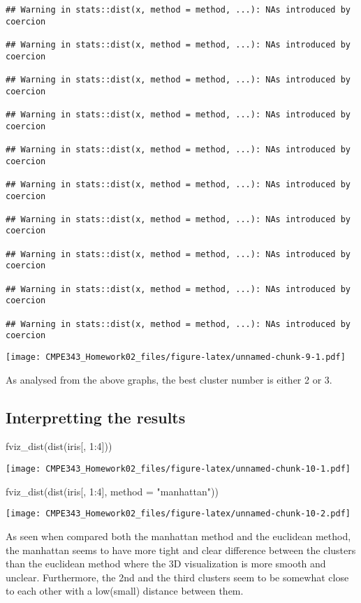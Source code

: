 \documentclass[
]{article}
\newenvironment{Shaded}{\begin{snugshade}}{\end{snugshade}}
\newcommand{\AttributeTok}[1]{\textcolor[rgb]{0.77,0.63,0.00}{#1}}
\newcommand{\DecValTok}[1]{\textcolor[rgb]{0.00,0.00,0.81}{#1}}
\newcommand{\FunctionTok}[1]{\textcolor[rgb]{0.00,0.00,0.00}{#1}}
\newcommand{\NormalTok}[1]{#1}
\newcommand{\SpecialCharTok}[1]{\textcolor[rgb]{0.00,0.00,0.00}{#1}}
\newcommand{\StringTok}[1]{\textcolor[rgb]{0.31,0.60,0.02}{#1}}
\begin{document}
\begin{verbatim}
## Warning in stats::dist(x, method = method, ...): NAs introduced by coercion

## Warning in stats::dist(x, method = method, ...): NAs introduced by coercion

## Warning in stats::dist(x, method = method, ...): NAs introduced by coercion

## Warning in stats::dist(x, method = method, ...): NAs introduced by coercion

## Warning in stats::dist(x, method = method, ...): NAs introduced by coercion

## Warning in stats::dist(x, method = method, ...): NAs introduced by coercion

## Warning in stats::dist(x, method = method, ...): NAs introduced by coercion

## Warning in stats::dist(x, method = method, ...): NAs introduced by coercion

## Warning in stats::dist(x, method = method, ...): NAs introduced by coercion

## Warning in stats::dist(x, method = method, ...): NAs introduced by coercion
\end{verbatim}

\texttt{[image: CMPE343\_Homework02\_files/figure-latex/unnamed-chunk-9-1.pdf]}

As analysed from the above graphs, the best cluster number is either 2
or 3.

\hypertarget{interpretting-the-results}{%
\subsection{Interpretting the results}\label{interpretting-the-results}}

\begin{Shaded}
\begin{Highlighting}[]
\FunctionTok{fviz\_dist}\NormalTok{(}\FunctionTok{dist}\NormalTok{(iris[, }\DecValTok{1}\SpecialCharTok{:}\DecValTok{4}\NormalTok{])) }
\end{Highlighting}
\end{Shaded}

\texttt{[image: CMPE343\_Homework02\_files/figure-latex/unnamed-chunk-10-1.pdf]}

\begin{Shaded}
\begin{Highlighting}[]
\FunctionTok{fviz\_dist}\NormalTok{(}\FunctionTok{dist}\NormalTok{(iris[, }\DecValTok{1}\SpecialCharTok{:}\DecValTok{4}\NormalTok{], }\AttributeTok{method =} \StringTok{"manhattan"}\NormalTok{)) }
\end{Highlighting}
\end{Shaded}

\texttt{[image: CMPE343\_Homework02\_files/figure-latex/unnamed-chunk-10-2.pdf]}

As seen when compared both the manhattan method and the euclidean
method, the manhattan seems to have more tight and clear difference
between the clusters than the euclidean method where the 3D
visualization is more smooth and unclear. Furthermore, the 2nd and the
third clusters seem to be somewhat close to each other with a low(small)
distance between them.
\end{document}
